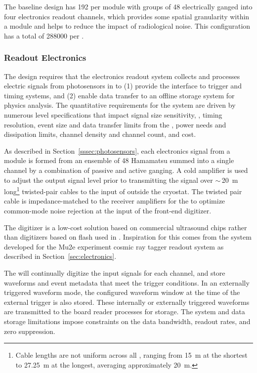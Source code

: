 The baseline  design has \num{192} %
 per  module with groups of \num{48}  electrically ganged into four electronics readout channels, which provides some spatial granularity within a module and helps to reduce the impact of radiological noise. This configuration has a total of \num{288000}  per . 


\subsubsection{Readout Electronics} 

The  design requires that the electronics readout system collects and processes electric signals from photosensors in \lar to (1) provide the interface to trigger and timing systems,
and (2) enable data transfer to an offline storage system for physics analysis. The quantitative requirements for the system are driven by numerous  level specifications that impact signal size sensitivity, , timing resolution, event size and data transfer limits from the , power needs and dissipation limits, channel density and channel count, and cost. 

As described in Section~\ref{sssec:photosensors}, each electronics signal from a  module is formed from an ensemble of 48 Hamamatsu  summed into a single channel by a combination of passive and active ganging.  A cold amplifier is used to adjust the  output signal level prior to transmitting the signal over $\sim\,$\SI{20}{m} long\footnote{Cable lengths are not uniform across all , ranging from \SI{15}{m} at the shortest to \SI{27.25}{m} at the longest, averaging approximately \SI{20}{m}.} twisted-pair cables to the input of   outside the cryostat.  The twisted pair cable is impedance-matched to  the receiver amplifiers for the  to optimize common-mode noise rejection at the input of the front-end digitizer. 

The digitizer is a low-cost solution based on commercial ultrasound  chips rather than digitizers based on flash  used in . Inspiration for this  comes from the system developed for the Mu2e experiment cosmic ray tagger readout system as described in Section~\ref{sec:electronics}.

The  will continually digitize the input signals for each channel, and store waveforms and  event metadata that meet the trigger conditions. In an externally triggered waveform mode, the configured waveform window at the time of the external trigger is also stored. These internally or externally triggered waveforms are transmitted to the  board reader processes for storage. The  system and data storage limitations impose constraints on the data bandwidth, readout rates, and zero suppression. 

